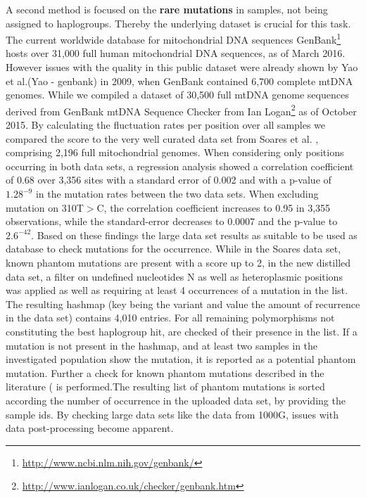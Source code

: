 A second method is focused on the \textbf{rare mutations} in samples, not being assigned to haplogroups. Thereby the underlying dataset is crucial for this task. The current worldwide database for mitochondrial DNA sequences GenBank\footnote{\url{http://www.ncbi.nlm.nih.gov/genbank/}} hosts over 31,000 full human mitochondrial DNA sequences, as of March 2016. However issues with the quality in this public dataset were already shown by Yao et al.(Yao - genbank) in 2009, when GenBank contained 6,700 complete mtDNA genomes. While we compiled a dataset of 30,500 full mtDNA genome sequences derived from GenBank mtDNA Sequence Checker from Ian Logan\footnote{\url{http://www.ianlogan.co.uk/checker/genbank.htm}} as of October 2015. By calculating the fluctuation rates per position over all samples we compared the score to the very well curated data set from Soares et al. \cite{Soares2009}, comprising 2,196 full mitochondrial genomes. When considering only positions occurring in both data sets, a regression analysis showed a correlation coefficient of 0.68 over 3,356 sites with a standard error of 0.002 and with a p-value of $1.28^{-9}$ in the mutation rates between the two data sets. When excluding mutation on 310T$>$C, the correlation coefficient increases to 0.95 in 3,355 observations, while the standard-error decreases to 0.0007 and the p-value to $2.6^{-42}$. Based on these findings the large data set results as suitable to be used as database to check mutations for the occurrence. While in the Soares data set, known phantom mutations are present with a score up to 2, in the new distilled data set, a filter on undefined nucleotides N as well as heteroplasmic positions was applied as well as requiring at least 4 occurrences of a mutation in the list. The resulting hashmap (key being the variant and value the amount of recurrence in the data set) contains 4,010 entries. For all remaining polymorphisms not constituting the best haplogroup hit, are checked of their presence in the list. If a mutation is not present in the hashmap, and at least two samples in the investigated population show the mutation, it is reported as a potential phantom mutation. Further a check for known phantom mutations described in the literature (\cite{Brandstatter2005,Bandelt2002} is performed.The resulting list of phantom mutations is sorted according the number of occurrence in the uploaded data set, by providing the sample ids. By checking large data sets like the data from 1000G, issues with data post-processing become apparent.

